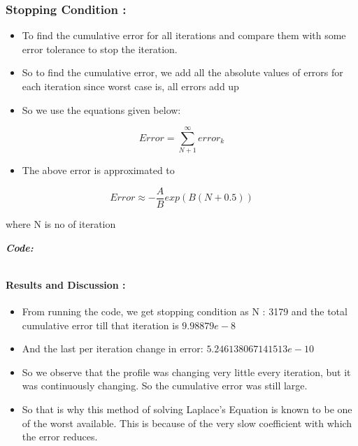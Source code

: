 \documentclass[11pt, a4paper, twoside]{article}
\begin{document}
\subsubsection{Stopping Condition :}\label{stopping-condition}

\begin{itemize}
\item
  To find the cumulative error for all iterations and compare them with
  some error tolerance to stop the iteration.
\item
  So to find the cumulative error, we add all the absolute values of
  errors for each iteration since worst case is, all errors add up
\item
  So we use the equations given below:
\end{itemize}

\begin{equation}
    Error = \sum_{N+1}^{\infty}error_k
  \end{equation}

\begin{itemize}
\item
  The above error is approximated to
\end{itemize}

\begin{equation}
    Error \approx -\frac{A}{B}exp(B(N+0.5))
    \end{equation}

where N is no of iteration

\textit{\textbf{Code:}}
\inputminted[linenos, breaklines]{python}{Code/4.py}
\paragraph{Results and Discussion :}\label{results-and-discussion4}

\begin{itemize}
\item
  From running the code, we get stopping condition as N : 3179 and the total cumulative
  error till that iteration is \(9.98879e-8\)
\item
  And the last per iteration change in error: \(5.246138067141513e-10\)
\item
  So we observe that the profile was changing very little every
  iteration, but it was continuously changing. So the cumulative error
  was still large.
\item
  So that is why this method of solving Laplace's Equation is known to
  be one of the worst available. This is because of the very slow
  coefficient with which the error reduces.
\end{itemize}
\end{document}
